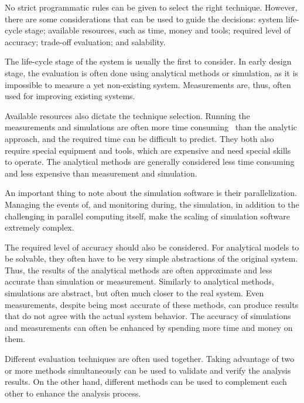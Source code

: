 No strict programmatic rules can be given to select the right technique. However, there are some considerations that can be used to guide the decisions: system life-cycle stage; available resources, such as time, money and tools; required level of accuracy; trade-off evaluation; and salability.~\cite{jain:1991:AOCSPA}

The life-cycle stage of the system is usually the first to consider. In early design stage, the evaluation is often done using analytical methods or simulation, as it is impossible to measure a yet non-existing system. Measurements are, thus, often used for improving existing systems.~\cite{jain:1991:AOCSPA}

Available resources also dictate the technique selection. Running the measurements and simulations are often more time consuming~\cite{Fujimoto:1990:PDE} than the analytic approach, and the required time can be difficult to predict. They both also require special equipment and tools, which are expensive and need special skills to operate. The analytical methods are generally considered less time consuming and less expensive than measurement and simulation.~\cite{jain:1991:AOCSPA}

An important thing to note about the simulation software is their parallelization. Managing the events of, and monitoring during, the simulation, in addition to the challenging in parallel computing itself, make the scaling of simulation software extremely complex.~\cite{Fujimoto:1990:PDE}

The required level of accuracy should also be considered. For analytical models to be solvable, they often have to be very simple abstractions of the original system. Thus, the results of the analytical methods are often approximate and less accurate than simulation or measurement. Similarly to analytical methods, simulations are abstract, but often much closer to the real system. Even measurements, despite being most accurate of these methods, can produce results that do not agree with the actual system behavior. The accuracy of simulations and measurements can often be enhanced by spending more time and money on them.~\cite{jain:1991:AOCSPA}

Different evaluation techniques are often used together. Taking advantage of two or more methods simultaneously can be used to validate and verify the analysis results. On the other hand, different methods can be used to complement each other to enhance the analysis process.~\cite{jain:1991:AOCSPA}

